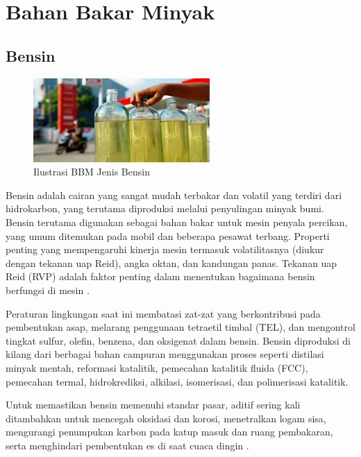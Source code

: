 \section{Bahan Bakar Minyak}
\label{sec:BBM-TP}

\subsection{Bensin}
\label{subsec:bensin-tp}

\begin{figure}[!ht]
    \centering
    \includegraphics[width=0.6\textwidth,keepaspectratio]{gambar/BENSIN.jpg}
    \caption{Ilustrasi BBM Jenis Bensin}
    \label{fig:ilus-bensin}
\end{figure}

Bensin adalah cairan yang sangat mudah terbakar dan volatil yang terdiri dari hidrokarbon, yang terutama diproduksi melalui penyulingan minyak bumi. Bensin terutama digunakan sebagai bahan bakar untuk mesin penyala percikan, yang umum ditemukan pada mobil dan beberapa pesawat terbang. Properti penting yang mempengaruhi kinerja mesin termasuk volatilitasnya (diukur dengan tekanan uap Reid), angka oktan, dan kandungan panas. Tekanan uap Reid (RVP) adalah faktor penting dalam menentukan bagaimana bensin berfungsi di mesin \citep{Hsu_Robinson_2017}.

Peraturan lingkungan saat ini membatasi zat-zat yang berkontribusi pada pembentukan asap, melarang penggunaan tetraetil timbal (TEL), dan mengontrol tingkat sulfur, olefin, benzena, dan oksigenat dalam bensin. Bensin diproduksi di kilang dari berbagai bahan campuran menggunakan proses seperti distilasi minyak mentah, reformasi katalitik, pemecahan katalitik fluida (FCC), pemecahan termal, hidrokrediksi, alkilasi, isomerisasi, dan polimerisasi katalitik.

Untuk memastikan bensin memenuhi standar pasar, aditif sering kali ditambahkan untuk mencegah oksidasi dan korosi, menetralkan logam sisa, mengurangi penumpukan karbon pada katup masuk dan ruang pembakaran, serta menghindari pembentukan es di saat cuaca dingin \citep{Hsu_Robinson_2017}.

